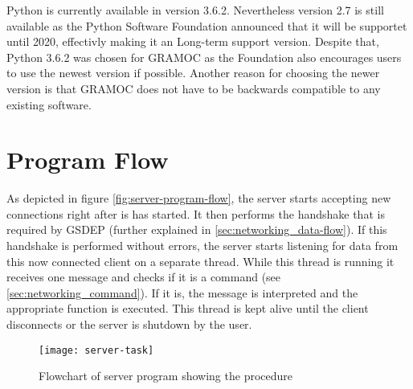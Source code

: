 Python is currently available in version 3.6.2. Nevertheless version 2.7 is still available as the Python Software Foundation announced that it will be supportet until 2020, effectivly making it an Long-term support version. Despite that, Python 3.6.2 was chosen for GRAMOC as the Foundation also encourages users to use the newest version if possible. Another reason for choosing the newer version is that GRAMOC does not have to be backwards compatible to any existing software.

\section{Program Flow}

As depicted in figure \vref{fig:server-program-flow}, the server starts accepting new connections right after is has started. It then performs the handshake that is required by GSDEP (further explained in \vref{sec:networking_data-flow}). If this handshake is performed without errors, the server starts listening for data from this now connected client on a separate thread. While this thread is running it receives one message and checks if it is a command (see \vref{sec:networking_command}). If it is, the message is interpreted and the appropriate function is executed. This thread is kept alive until the client disconnects or the server is shutdown by the user.

\begin{figure}[H]
	\centering
	\texttt{[image: server-task]}
	\caption{Flowchart of server program showing the procedure}
	\label{fig:server-program-flow}
\end{figure}

